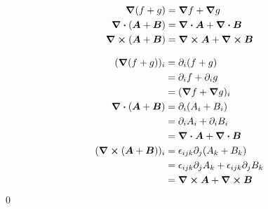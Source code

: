 \documentclass[uplatex,dvipdfmx,a4paper,11pt]{jlreq}
\makeatletter
\newcommand{\rot}{\curl}
\theoremstyle{definition}
\renewenvironment{proof}[1][\proofname]{\par
  \normalfont
  \topsep6\p@\@plus6\p@ \trivlist
  \item[\hskip\labelsep{\bfseries #1}\@addpunct{\bfseries}]\ignorespaces\quad\par
}{%
  \qed\endtrivlist\@endpefalse
}
\renewcommand\proofname{証明}
\makeatother
\begin{document}
\begin{theorem}[勾配・発散・回転の線形性]
  \begin{align}
    \grad{(f+g)}          & = \grad{f} + \grad{g}         \\
    \div{(\bm{A}+\bm{B})} & = \div{\bm{A}} + \div{\bm{B}} \\
    \rot{(\bm{A}+\bm{B})} & = \rot{\bm{A}} + \rot{\bm{B}}
  \end{align}
\end{theorem}
\begin{proof}
  \begin{align}
    (\grad{(f+g)})_i            & = \partial_i(f+g)                                           \\
                                & = \partial_i f + \partial_i g                               \\
                                & = (\grad{f} + \grad{g})_i                                   \\
    \div{(\bm{A}+\bm{B})}       & = \partial_i(A_i + B_i)                                     \\
                                & = \partial_i A_i + \partial_i B_i                           \\
                                & = \div{\bm{A}}+\div{\bm{B}}                                 \\
    (\rot{(\bm{A} + \bm{B})})_i & = \epsilon_{ijk}\partial_j(A_k + B_k)                       \\
                                & = \epsilon_{ijk}\partial_jA_k + \epsilon_{ijk}\partial_jB_k \\
                                & = \rot{\bm{A}} + \rot{\bm{B}}
  \end{align}
\end{proof}
\end{document}
